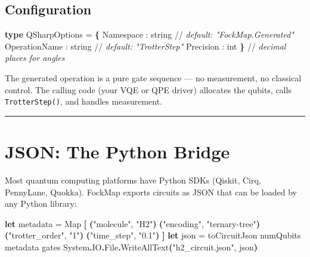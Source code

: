 \documentclass[
  11pt,
  oneside]{book}
\newenvironment{Shaded}{\begin{snugshade}}{\end{snugshade}}
\newcommand{\CommentTok}[1]{\textcolor[rgb]{0.56,0.35,0.01}{\textit{#1}}}
\newcommand{\DataTypeTok}[1]{\textcolor[rgb]{0.13,0.29,0.53}{#1}}
\newcommand{\KeywordTok}[1]{\textcolor[rgb]{0.13,0.29,0.53}{\textbf{#1}}}
\newcommand{\NormalTok}[1]{#1}
\newcommand{\OperatorTok}[1]{\textcolor[rgb]{0.81,0.36,0.00}{\textbf{#1}}}
\newcommand{\StringTok}[1]{\textcolor[rgb]{0.31,0.60,0.02}{#1}}
\begin{document}
\subsection{Configuration}\label{configuration-1}

\begin{Shaded}
\begin{Highlighting}[]
\KeywordTok{type}\NormalTok{ QSharpOptions =}
    \OperatorTok{\{}\NormalTok{ Namespace     : }\DataTypeTok{string}\NormalTok{    //}\CommentTok{ default: "FockMap.Generated"}
\NormalTok{      OperationName : }\DataTypeTok{string}\NormalTok{    //}\CommentTok{ default: "TrotterStep"}
\NormalTok{      Precision     : }\DataTypeTok{int} \OperatorTok{\}}\NormalTok{     //}\CommentTok{ decimal places for angles}
\end{Highlighting}
\end{Shaded}

The generated operation is a pure gate sequence --- no measurement, no
classical control. The calling code (your VQE or QPE driver) allocates
the qubits, calls \texttt{TrotterStep()}, and handles measurement.

\begin{center}\rule{0.5\linewidth}{0.5pt}\end{center}

\section{JSON: The Python Bridge}\label{json-the-python-bridge}

Most quantum computing platforms have Python SDKs (Qiskit, Cirq,
PennyLane, Quokka). FockMap exports circuits as JSON that can be loaded
by any Python library:

\begin{Shaded}
\begin{Highlighting}[]
\KeywordTok{let}\NormalTok{ metadata = Map }\OperatorTok{[}
    \OperatorTok{(}\StringTok{"molecule"}\NormalTok{, }\StringTok{"H2"}\OperatorTok{)}
    \OperatorTok{(}\StringTok{"encoding"}\NormalTok{, }\StringTok{"ternary{-}tree"}\OperatorTok{)}
    \OperatorTok{(}\StringTok{"trotter\_order"}\NormalTok{, }\StringTok{"1"}\OperatorTok{)}
    \OperatorTok{(}\StringTok{"time\_step"}\NormalTok{, }\StringTok{"0.1"}\OperatorTok{)}
\OperatorTok{]}
\KeywordTok{let}\NormalTok{ json = toCircuitJson numQubits metadata gates}
\NormalTok{System}\KeywordTok{.}\NormalTok{IO}\KeywordTok{.}\NormalTok{File}\KeywordTok{.}\NormalTok{WriteAllText}\OperatorTok{(}\StringTok{"h2\_circuit.json"}\NormalTok{, json}\OperatorTok{)}
\end{Highlighting}
\end{Shaded}
\end{document}
